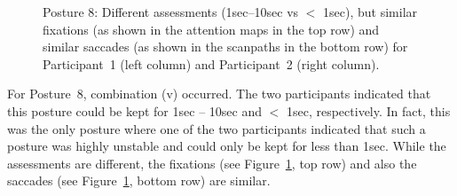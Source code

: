 \documentclass[11pt]{asaproc}
\begin{document}
\begin{figure}[t]
\begin{center}
\end{center}
\caption{\label{Posture8View}Posture 8: Different assessments (1sec--10sec vs $<$ 1sec),
but similar fixations (as shown in the attention maps in the top row) and 
similar saccades (as shown in the scanpaths in the bottom row)
for Participant~1 (left column) and Participant~2 (right column).
}
\end{figure}


For Posture~8, combination (v) occurred.
The two participants indicated that this posture could be kept for
1sec -- 10sec and $<$ 1sec, respectively. In fact, this was the only posture where
one of the two participants indicated that such a posture was highly unstable and
could only be kept for less than 1sec. While the assessments are different, the
fixations (see Figure~\ref{Posture8View}, top row) and also 
the saccades (see Figure~\ref{Posture8View}, bottom row) are similar.


\end{document}
